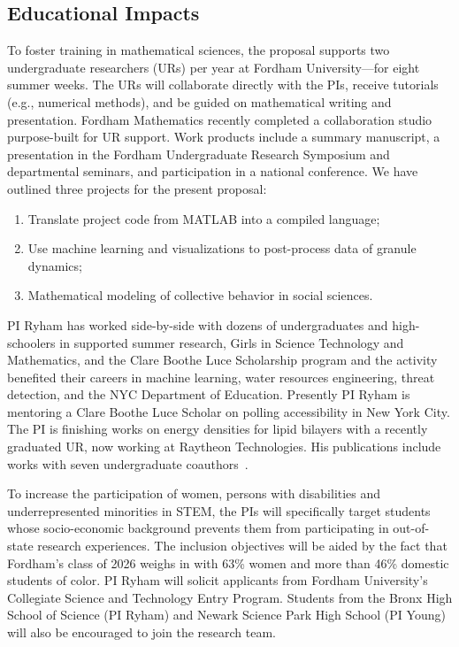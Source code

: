 \subsection{Educational Impacts}
\label{subsec:Educational_plans}
To foster training in mathematical sciences, the proposal supports two
undergraduate researchers (URs) per year at Fordham University---for
eight summer weeks. The URs will collaborate directly with the PIs,
receive tutorials (e.g., numerical methods), and be guided on
mathematical writing and presentation. Fordham Mathematics recently
completed a collaboration studio purpose-built for UR support. Work
products include a summary manuscript, a presentation in the Fordham
Undergraduate Research Symposium and departmental seminars, and
participation in a national conference. We have outlined three projects
for the present proposal:
\begin{enumerate}[noitemsep,topsep=0pt]
  \item Translate project code from MATLAB into a compiled language;
  \item Use machine learning and visualizations to post-process data of
    granule dynamics;
  \item Mathematical modeling of collective behavior in social sciences.
\end{enumerate}
PI Ryham has worked side-by-side with dozens of undergraduates and
high-schoolers in supported summer research, Girls in Science Technology
and Mathematics, and the Clare Boothe Luce Scholarship program and the
activity benefited their careers in machine learning, water resources
engineering, threat detection, and the NYC Department of Education.
Presently PI Ryham is mentoring a Clare Boothe Luce Scholar on polling
accessibility in New York City. The PI is finishing works on energy
densities for lipid bilayers with a recently graduated UR, now working
at Raytheon Technologies. His publications include works with seven
undergraduate coauthors~\cite{Figueroa2012CuttingCI, RYHAM20112929,
RyWaCo13, RyKlYaCo16}.

To increase the participation of women, persons with disabilities and
underrepresented minorities in STEM, the PIs will specifically target
students whose socio-economic background prevents them from
participating in out-of-state research experiences. The inclusion
objectives will be aided by the fact that Fordham's class of 2026 weighs
in with 63\% women and more than 46\% domestic students of color. PI
Ryham will solicit applicants from Fordham University's Collegiate
Science and Technology Entry Program. Students from the Bronx High
School of Science (PI Ryham) and Newark Science Park High School (PI
Young) will also be encouraged to join the research team. 

